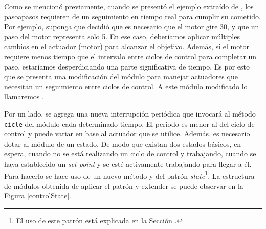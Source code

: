
Como se mencionó previamente, cuando se presentó el ejemplo extraído de \citep{douglass}, los \glspl{pasoapaso} requieren de un seguimiento en tiempo real para cumplir su cometido. Por ejemplo, suponga que \Control decidió que es necesario que el motor gire 30\degree, y que un paso del motor representa solo 5\degree. En ese caso, deberíamos aplicar múltiples cambios en el actuador (motor) para alcanzar el objetivo. Además, si el motor requiere menos tiempo que el intervalo entre ciclos de control para completar un paso, estaríamos desperdiciando una parte significativa de tiempo. Es por esto que se presenta una modificación del módulo \Control para manejar actuadores que necesitan un seguimiento entre ciclos de control. A este módulo modificado lo llamaremos \ControlSeguimiento.

Por un lado, se agrega una nueva interrupción periódica que invocará al método \verb|cicle| del módulo \ControlSeguimiento cada determinado tiempo. El periodo es menor al del ciclo de control y puede variar en base al actuador que se utilice.
Además, es necesario dotar al módulo de un estado. De modo que existan dos estados básicos, en espera, cuando no se está realizando un ciclo de control y trabajando, cuando se haya establecido un \textit{set-point} y se esté activamente trabajando para llegar a él. Para hacerlo se hace uso de un nuevo método y del patrón \textit{state}\footnote{El uso de este patrón está explicada en la Sección .}. La estructura de módulos obtenida de aplicar el patrón y extender \Control se puede observar en la Figura \ref{controlState}.

